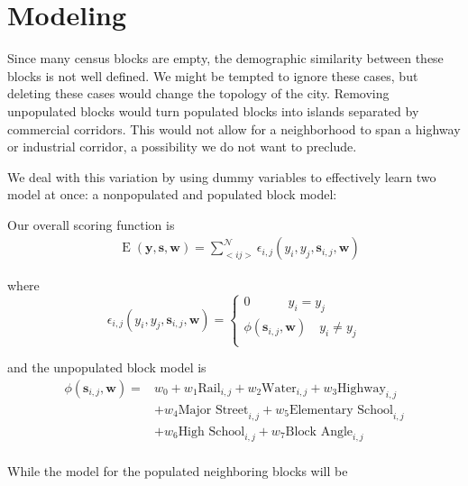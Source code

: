 \documentclass[12pt,letter]{article}\usepackage[]{graphicx}\usepackage[]{color}
\begin{document}
\section*{Modeling}
Since many census blocks are empty, the demographic similarity between
these blocks is not well defined. We might be tempted to ignore these
cases, but deleting these cases would change the topology of the
city. Removing unpopulated blocks would turn populated blocks into
islands separated by commercial corridors. This would not allow for a
neighborhood to span a highway or industrial corridor, a possibility
we do not want to preclude.

We deal with this variation by using dummy variables to effectively
learn two model at once: a nonpopulated and populated block model:

Our overall scoring function is 
\begin{align}
&\operatorname{E}(\mathbf{y}, \mathbf{s}, \mathbf{w}) = \sum_{<i
    j>}^{\mathcal{N}}\epsilon_{i,j}(y_i, y_j, \mathbf{s}_{i,j}, \mathbf{w})  
\end{align}

where 
\begin{equation}
\epsilon_{i,j}(y_i, y_j, \mathbf{s}_{i,j}, \mathbf{w}) = \begin{cases}
    0 \quad\quad\quad y_i = y_j \\
    \phi(\mathbf{s}_{i,j}, \mathbf{w}) \quad y_i \neq y_j \\
  \end{cases}
\end{equation}

and the unpopulated block model is 
\begin{align}
\phi(\mathbf{s}_{i,j}, \mathbf{w}) = & w_0 
                                     + w_1\text{Rail}_{i,j} 
                                     + w_2\text{Water}_{i,j} 
                                     + w_3\text{Highway}_{i,j} \\
                                     &+ w_4\text{Major Street}_{i,j} 
                                     + w_5\text{Elementary School}_{i,j}\\ 
                                     & + w_6\text{High School}_{i,j}
                                     + w_7\text{Block Angle}_{i,j} \\
\end{align}

While the model for the populated neighboring blocks will be
\end{document}
